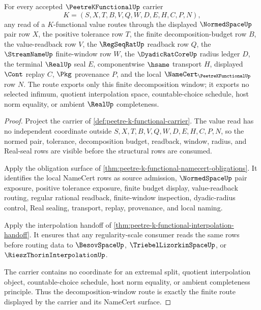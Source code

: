 \begin{theorem}
\label{thm:peetre-k-functional-decomposition-window-route}
For every accepted $\PeetreKFunctionalUp$ carrier
$$
K=(S,X,T,B,V,Q,W,D,E,H,C,P,N),
$$
any read of a $K$-functional value routes through the displayed $\NormedSpaceUp$ pair row $X$, the positive tolerance row $T$, the finite decomposition-budget row $B$, the value-readback row $V$, the $\RegSeqRatUp$ readback row $Q$, the $\StreamNameUp$ finite-window row $W$, the $\DyadicRatCoreUp$ radius ledger $D$, the terminal $\RealUp$ seal $E$, componentwise $\hsame$ transport $H$, displayed $\Cont$ replay $C$, $\Pkg$ provenance $P$, and the local $\NameCert_{\PeetreKFunctionalUp}$ row $N$. The route exports only this finite decomposition window; it exports no selected infimum, quotient interpolation space, countable-choice schedule, host norm equality, or ambient $\RealUp$ completeness.
\end{theorem}
\begin{proof}
Project the carrier of \autoref{def:peetre-k-functional-carrier}. The value read has no independent coordinate outside $S,X,T,B,V,Q,W,D,E,H,C,P,N$, so the normed pair, tolerance, decomposition budget, readback, window, radius, and Real-seal rows are visible before the structural rows are consumed.

Apply the obligation surface of \autoref{thm:peetre-k-functional-namecert-obligations}. It identifies the local NameCert rows as source admission, $\NormedSpaceUp$ pair exposure, positive tolerance exposure, finite budget display, value-readback routing, regular rational readback, finite-window inspection, dyadic-radius control, Real sealing, transport, replay, provenance, and local naming.

Apply the interpolation handoff of \autoref{thm:peetre-k-functional-interpolation-handoff}. It ensures that any regularity-scale consumer reads the same rows before routing data to $\BesovSpaceUp$, $\TriebelLizorkinSpaceUp$, or $\RieszThorinInterpolationUp$.

The carrier contains no coordinate for an extremal split, quotient interpolation object, countable-choice schedule, host norm equality, or ambient completeness principle. Thus the decomposition-window route is exactly the finite route displayed by the carrier and its NameCert surface.
\end{proof}


